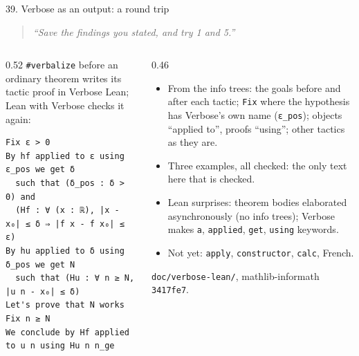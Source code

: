 \documentclass[10pt,aspectratio=169]{beamer}
\newcommand{\ok}[1]{\textcolor{good}{#1}}
\newcommand{\commit}[1]{\texttt{\footnotesize #1}}
\newcommand{\prompt}[1]{\begin{quote}\small\itshape ``#1''\end{quote}}
\begin{document}
\begin{frame}[fragile]{39. Verbose as an output: a round trip}
  \scriptsize
  \prompt{Save the findings you stated, and try 1 and 5.}
  \begin{columns}[T]
    \begin{column}{0.52\textwidth}
      \texttt{\#verbalize} before an ordinary theorem writes its tactic proof in Verbose Lean;
      Lean with Verbose checks it again:
\begin{lstlisting}
Fix ε > 0
By hf applied to ε using ε_pos we get δ
  such that (δ_pos : δ > 0) and
  (Hf : ∀ (x : ℝ), |x - x₀| ≤ δ ⇒ |f x - f x₀| ≤ ε)
By hu applied to δ using δ_pos we get N
  such that (Hu : ∀ n ≥ N, |u n - x₀| ≤ δ)
Let's prove that N works
Fix n ≥ N
We conclude by Hf applied to u n using Hu n n_ge
\end{lstlisting}
    \end{column}
    \begin{column}{0.46\textwidth}
      \begin{itemize}
        \item From the info trees: the goals before and after each tactic; \texttt{Fix} where
              the hypothesis has Verbose's own name (\texttt{ε\_pos}); objects ``applied to'',
              proofs ``using''; other tactics as they are.
        \item Three examples, all checked: \ok{the only text here that is checked}.
        \item Lean surprises: theorem bodies elaborated asynchronously (no info trees);
              Verbose makes \texttt{a}, \texttt{applied}, \texttt{get}, \texttt{using} keywords.
        \item Not yet: \texttt{apply}, \texttt{constructor}, \texttt{calc}, French.
      \end{itemize}
      \texttt{doc/verbose-lean/}, mathlib-informath \commit{3417fe7}.
    \end{column}
  \end{columns}
\end{frame}
\end{document}
